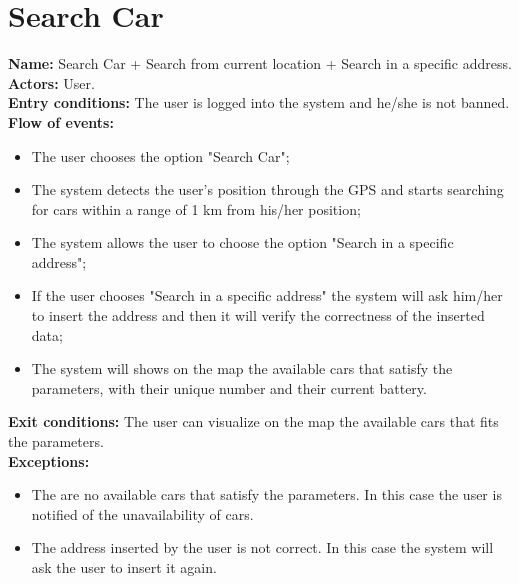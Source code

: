 \section*{Search Car}
\textbf{Name:} Search Car + Search from current location + Search in a specific address.\\
\textbf{Actors:} User.\\
\textbf{Entry conditions:} The user is logged into the system and he/she is not banned.\\
\textbf{Flow of events:}
\begin{itemize}
\item The user chooses the option "Search Car";
\item The system detects the user's position through the GPS and starts searching for cars within a range of 1 km from his/her position;
\item The system allows the user to choose the option "Search in a specific address";
\item If the user chooses "Search in a specific address" the system will ask him/her to insert the address and then it will verify the correctness of the inserted data;
\item The system will shows on the map the available cars that satisfy the parameters, with their unique number and their current battery.
\end{itemize}
\textbf{Exit conditions:} The user can visualize on the map the available cars that fits the parameters.\\
\textbf{Exceptions:}  
\begin{itemize}
\item The are no available cars that satisfy the parameters. In this case the user is notified of the unavailability of cars.
\item The address inserted by the user is not correct. In this case the system will ask the user to insert it again.
\end{itemize}

